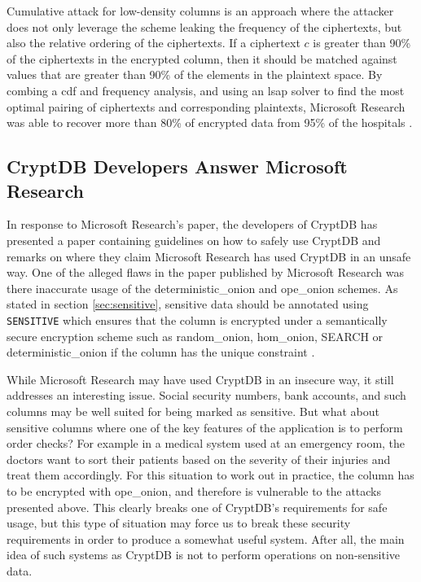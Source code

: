 Cumulative attack for low-density columns is an approach where the attacker does not only leverage the scheme leaking the frequency of the ciphertexts, but also the relative ordering of the ciphertexts. If a ciphertext $c$ is greater than 90\% of the ciphertexts in the encrypted column, then it should be matched against values that are greater than 90\% of the elements in the plaintext space. By combing a \gls{cdf} and frequency analysis, and using an \gls{lsap} solver to find the most optimal pairing of ciphertexts and corresponding plaintexts, Microsoft Research was able to recover more than 80\% of encrypted data from 95\% of the hospitals \cite{microsoft_cryptdb}.

\subsection{CryptDB Developers Answer Microsoft Research}

In response to Microsoft Research's paper, the developers of CryptDB has presented a paper containing guidelines \cite{cryptdb_guidelines} on how to safely use CryptDB and remarks on where they claim Microsoft Research has used CryptDB in an unsafe way. One of the alleged flaws in the paper published by Microsoft Research was there inaccurate usage of the \gls{deterministic_onion} and \gls{ope_onion} schemes. As stated in section \ref{sec:sensitive}, sensitive data should be annotated using \verb!SENSITIVE! which ensures that the column is encrypted under a semantically secure encryption scheme such as \gls{random_onion}, \gls{hom_onion}, SEARCH or \gls{deterministic_onion} if the column has the unique constraint \cite{popa_thesis}. 

While Microsoft Research may have used CryptDB in an insecure way, it still addresses an interesting issue. Social security numbers, bank accounts, and such columns may be well suited for being marked as sensitive. But what about sensitive columns where one of the key features of the application is to perform order checks? For example in a medical system used at an emergency room, the doctors want to sort their patients based on the severity of their injuries and treat them accordingly. For this situation to work out in practice, the column has to be encrypted with \gls{ope_onion}, and therefore is vulnerable to the attacks presented above. This clearly breaks one of CryptDB's requirements for safe usage, but this type of situation may force us to break these security requirements in order to produce a somewhat useful system. After all, the main idea of such systems as CryptDB is not to perform operations on non-sensitive data.